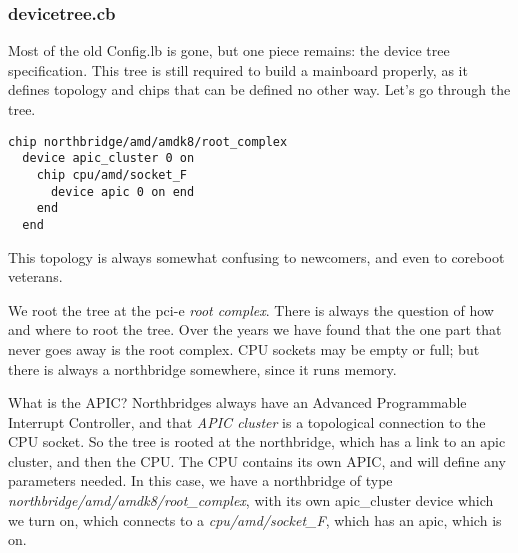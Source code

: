 \documentclass[10pt,letterpaper]{article}
\begin{document}
\subsubsection{devicetree.cb}
Most of the old Config.lb is gone, but one piece remains: the device tree specification. This tree is still required to build a mainboard
properly, as it defines topology and chips that can be defined no other way.
Let's go through the tree.
\begin{verbatim}
chip northbridge/amd/amdk8/root_complex
  device apic_cluster 0 on
    chip cpu/amd/socket_F
      device apic 0 on end
    end
  end
\end{verbatim}
This topology is always somewhat confusing to newcomers, and even to coreboot veterans.

We root the tree at the pci-e {\it root complex}. There is always the question of how and where to root the tree. Over the years we
have found that the one part that never goes away is the root complex. CPU sockets may be empty or full; but there is always a northbridge
somewhere, since it runs memory.


What is the APIC? Northbridges always have an Advanced Programmable Interrupt Controller, and that {\it APIC cluster} is a topological connection to the
CPU socket. So the tree is rooted at the northbridge, which has a link to an apic cluster, and then the CPU. The CPU contains
its own APIC, and will define any parameters needed. In this case, we have a northbridge of type
{\it northbridge/amd/amdk8/root\_complex}, with its own apic\_cluster device which we turn on,
which connects to a {\it cpu/amd/socket\_F},
which has an apic, which is on.
\end{document}

